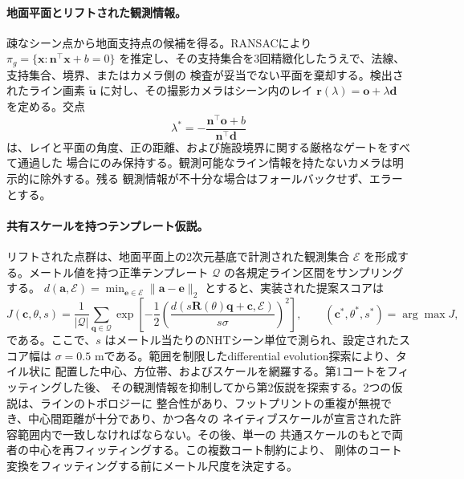 \paragraph{地面平面とリフトされた観測情報。}
疎なシーン点から地面支持点の候補を得る。RANSACにより
\(
  \pi_g=\{\mathbf{x}:\mathbf{n}^{\top}\mathbf{x}+b=0\}
\)
を推定し、その支持集合を3回精緻化したうえで、法線、支持集合、境界、またはカメラ側の
検査が妥当でない平面を棄却する。検出されたライン画素
\(\tilde{\mathbf{u}}\) に対し、その撮影カメラはシーン内のレイ
\(
  \mathbf{r}(\lambda)=\mathbf{o}+\lambda\mathbf{d}
\)
を定める。交点
\begin{equation}
  \lambda^*=-\frac{\mathbf{n}^{\top}\mathbf{o}+b}
                    {\mathbf{n}^{\top}\mathbf{d}}
  \label{eq:ray_plane}
\end{equation}
は、レイと平面の角度、正の距離、および施設境界に関する厳格なゲートをすべて通過した
場合にのみ保持する。観測可能なライン情報を持たないカメラは明示的に除外する。残る
観測情報が不十分な場合はフォールバックせず、エラーとする。

\paragraph{共有スケールを持つテンプレート仮説。}
リフトされた点群は、地面平面上の2次元基底で計測された観測集合
\(\mathcal{E}\) を形成する。メートル値を持つ正準テンプレート
\(\mathcal{Q}\) の各規定ライン区間をサンプリングする。
\(d(\mathbf{a},\mathcal{E})=\min_{\mathbf{e}\in\mathcal{E}}
\|\mathbf{a}-\mathbf{e}\|_2\) とすると、実装された提案スコアは
\begin{equation}
  J(\mathbf{c},\theta,s)=\frac{1}{|\mathcal{Q}|}
  \sum_{\mathbf{q}\in\mathcal{Q}}
  \exp\!\left[-\frac{1}{2}
    \left(\frac{d(s\mathbf{R}(\theta)\mathbf{q}+\mathbf{c},\mathcal{E})}
                    {s\sigma}\right)^2\right],
  \qquad
  (\mathbf{c}^*,\theta^*,s^*)=\arg\max J,
  \label{eq:template_fit}
\end{equation}
である。ここで、\(s\) はメートル当たりのNHTシーン単位で測られ、設定されたスコア幅は
\(\sigma=0.5\) mである。範囲を制限したdifferential evolution探索により、タイル状に
配置した中心、方位帯、およびスケールを網羅する。第1コートをフィッティングした後、
その観測情報を抑制してから第2仮説を探索する。2つの仮説は、ラインのトポロジーに
整合性があり、フットプリントの重複が無視でき、中心間距離が十分であり、かつ各々の
ネイティブスケールが宣言された許容範囲内で一致しなければならない。その後、単一の
共通スケールのもとで両者の中心を再フィッティングする。この複数コート制約により、
剛体のコート変換をフィッティングする前にメートル尺度を決定する。


